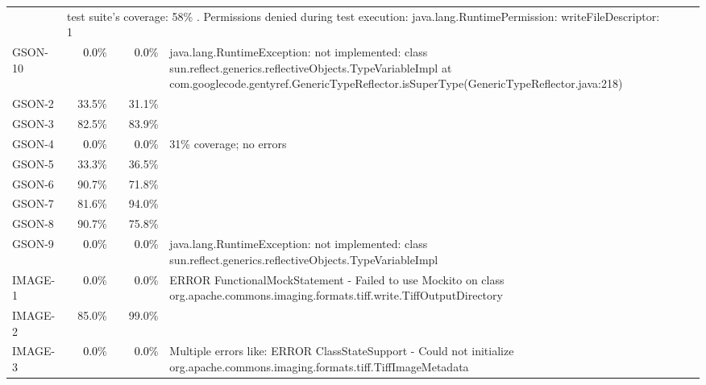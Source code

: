 \begin{tabular}{ l rrrrrrr rrrrrrrr}
 & \multicolumn{13}{l}{test suite's coverage: 58\% .  Permissions denied during test execution:  java.lang.RuntimePermission: writeFileDescriptor: 1} \\ 
GSON-10 & \cellcolor{light-gray} \textcolor{black}{0.0}\% &
                                                            \cellcolor{light-gray}
                                                            \textcolor{black}{0.0}\%
 &  \multicolumn{13}{l}{java.lang.RuntimeException: not implemented:
   class sun.reflect.generics.reflectiveObjects.TypeVariableImpl at com.googlecode.gentyref.GenericTypeReflector.isSuperType(GenericTypeReflector.java:218)} \\ 
GSON-2 & 33.5\% & 31.1\%\\ 
GSON-3 & 82.5\% & 83.9\%\\ 
GSON-4 & \cellcolor{light-gray} \textcolor{black}{0.0}\% &
                                                           \cellcolor{light-gray}
                                                           \textcolor{black}{0.0}\%
 & \multicolumn{13}{l}{31\% coverage; no errors}\\ 
GSON-5 & 33.3\% & 36.5\%\\ 
GSON-6 & 90.7\% & 71.8\%\\ 
GSON-7 & 81.6\% & 94.0\%\\ 
GSON-8 & 90.7\% & 75.8\%\\ 
GSON-9 & \cellcolor{light-gray} \textcolor{black}{0.0}\% &
                                                           \cellcolor{light-gray}
                                                           \textcolor{black}{0.0}\%
 & \multicolumn{13}{l}{java.lang.RuntimeException: not implemented: class sun.reflect.generics.reflectiveObjects.TypeVariableImpl}\\ 
IMAGE-1 & \cellcolor{light-gray} \textcolor{black}{0.0}\% &
                                                            \cellcolor{light-gray}
                                                            \textcolor{black}{0.0}\%
 & \multicolumn{13}{l}{ERROR FunctionalMockStatement - Failed to use Mockito on class org.apache.commons.imaging.formats.tiff.write.TiffOutputDirectory}\\ 
IMAGE-2 & 85.0\% & 99.0\%\\ 
IMAGE-3 & \cellcolor{light-gray} \textcolor{black}{0.0}\% &
                                                            \cellcolor{light-gray}
                                                            \textcolor{black}{0.0}\%
 & \multicolumn{13}{l}{Multiple errors like: ERROR ClassStateSupport - Could not initialize org.apache.commons.imaging.formats.tiff.TiffImageMetadata}\\ 

\end{tabular}
